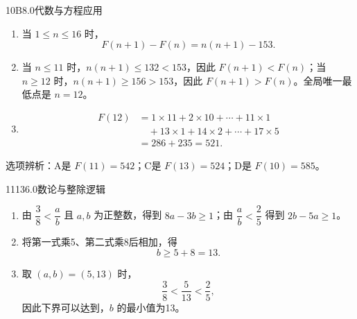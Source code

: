 \begin{solution}{10}{B}{8.0}{代数与方程应用}
\begin{enumerate}[label=\textbf{Step \arabic*:},leftmargin=*]
\item 当 \(1\le n\le16\) 时，
\[
  F(n+1)-F(n)=n(n+1)-153.
\]
\item 当 \(n\le11\) 时，\(n(n+1)\le132<153\)，因此 \(F(n+1)<F(n)\)；当 \(n\ge12\) 时，\(n(n+1)\ge156>153\)，因此 \(F(n+1)>F(n)\)。全局唯一最低点是 \(n=12\)。
\item
\[
\begin{aligned}
F(12)
&=1\times11+2\times10+\cdots+11\times1\\
&\quad+13\times1+14\times2+\cdots+17\times5\\
&=286+235=521.
\end{aligned}
\]
\end{enumerate}
选项辨析：A是 \(F(11)=542\)；C是 \(F(13)=524\)；D是 \(F(10)=585\)。
\end{solution}


\begin{solution}{11}{13}{6.0}{数论与整除逻辑}
\begin{enumerate}[label=\textbf{Step \arabic*:},leftmargin=*]
\item 由 \(\dfrac{3}{8}<\dfrac{a}{b}\) 且 \(a,b\) 为正整数，得到 \(8a-3b\ge1\)；由 \(\dfrac{a}{b}<\dfrac{2}{5}\) 得到 \(2b-5a\ge1\)。
\item 将第一式乘5、第二式乘8后相加，得
\[
  b\ge5+8=13.
\]
\item 取 \((a,b)=(5,13)\) 时，
\[
  \frac{3}{8}<\frac{5}{13}<\frac{2}{5},
\]
因此下界可以达到，\(b\) 的最小值为13。
\end{enumerate}
\end{solution}

